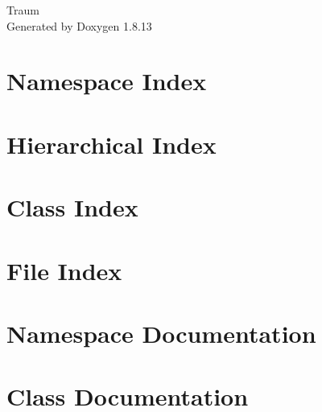 \documentclass[twoside]{book}
\newcommand{\+}{\discretionary{\mbox{\scriptsize$\hookleftarrow$}}{}{}}
\newcommand{\clearemptydoublepage}{%
  \newpage{\pagestyle{empty}\cleardoublepage}%
}
\begin{document}
\hypersetup{pageanchor=false,
             bookmarksnumbered=true,
             pdfencoding=unicode
            }
\begin{titlepage}
\vspace*{7cm}
\begin{center}%
{\Large Traum }\\
\vspace*{1cm}
{\large Generated by Doxygen 1.8.13}\\
\end{center}
\end{titlepage}
\clearemptydoublepage
{}
\tableofcontents
\clearemptydoublepage
{}
\hypersetup{pageanchor=true}

\chapter{Namespace Index}

\chapter{Hierarchical Index}

\chapter{Class Index}

\chapter{File Index}

\chapter{Namespace Documentation}

\chapter{Class Documentation}


























\end{document}
